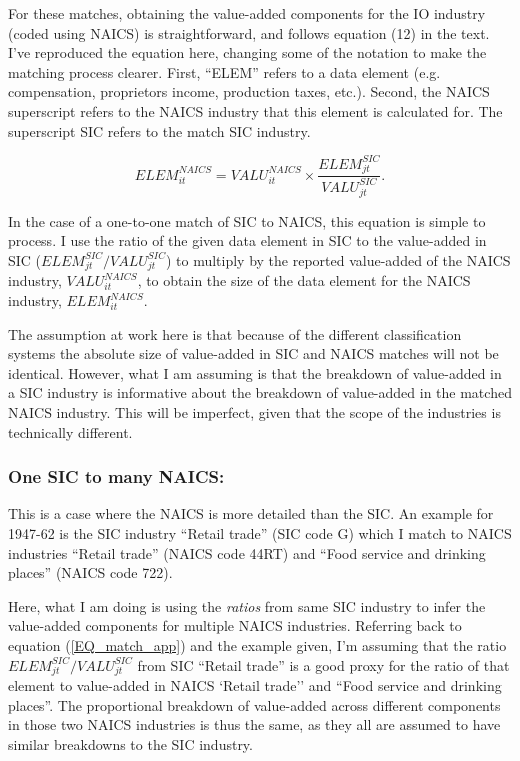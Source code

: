 \documentclass[11pt]{article}
\begin{document}
For these matches, obtaining the value-added components for the IO industry (coded using NAICS) is straightforward, and follows equation (12) in the text. I've reproduced the equation here, changing some of the notation to make the matching process clearer. First, ``ELEM'' refers to a data element (e.g. compensation, proprietors income, production taxes, etc.). Second, the NAICS superscript refers to the NAICS industry that this element is calculated for. The superscript SIC refers to the match SIC industry. 

\begin{equation}
	ELEM_{it}^{NAICS} = VALU_{it}^{NAICS} \times \frac{ELEM_{jt}^{SIC}}{VALU_{jt}^{SIC}}. \label{EQ_match_app}
\end{equation}

In the case of a one-to-one match of SIC to NAICS, this equation is simple to process. I use the ratio of the given data element in SIC to the value-added in SIC ($ELEM_{jt}^{SIC}/VALU_{jt}^{SIC}$) to multiply by the reported value-added of the NAICS industry, $VALU_{it}^{NAICS}$, to obtain the size of the data element for the NAICS industry, $ELEM_{it}^{NAICS}$. 

The assumption at work here is that because of the different classification systems the absolute size of value-added in SIC and NAICS matches will not be identical. However, what I am assuming is that the breakdown of value-added in a SIC industry is informative about the breakdown of value-added in the matched NAICS industry. This will be imperfect, given that the scope of the industries is technically different. 

\subsubsection{One SIC to many NAICS:} This is a case where the NAICS is more detailed than the SIC. An example for 1947-62 is the SIC industry ``Retail trade'' (SIC code G) which I match to NAICS industries ``Retail trade'' (NAICS code 44RT) and ``Food service and drinking places'' (NAICS code 722). 

Here, what I am doing is using the \textit{ratios} from same SIC industry to infer the value-added components for multiple NAICS industries. Referring back to equation (\ref{EQ_match_app}) and the example given, I'm assuming that the ratio $ELEM_{jt}^{SIC}/VALU_{jt}^{SIC}$ from SIC ``Retail trade'' is a good proxy for the ratio of that element to value-added in NAICS `Retail trade'' and ``Food service and drinking places''. The proportional breakdown of value-added across different components in those two NAICS industries is thus the same, as they all are assumed to have similar breakdowns to the SIC industry. 
\end{document}
